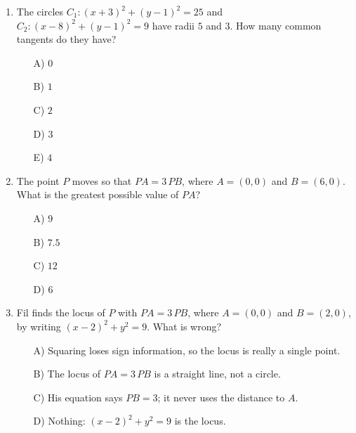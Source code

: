 \documentclass[11pt,a4paper]{article}
\begin{document}
\begin{enumerate}
\item The circles $C_1:(x+3)^2+(y-1)^2=25$ and $C_2:(x-8)^2+(y-1)^2=9$ have radii $5$ and $3$. How many common tangents do they have?
\begin{itemize}
\item[A)] $0$
\item[B)] $1$
\item[C)] $2$
\item[D)] $3$
\item[E)] $4$
\end{itemize}


\item The point $P$ moves so that $PA=3\,PB$, where $A=(0,0)$ and $B=(6,0)$. What is the greatest possible value of $PA$?
\begin{itemize}
\item[A)] $9$
\item[B)] $7.5$
\item[C)] $12$
\item[D)] $6$
\end{itemize}


\item Fil finds the locus of $P$ with $PA=3\,PB$, where $A=(0,0)$ and $B=(2,0)$, by writing $(x-2)^2+y^2=9$. What is wrong?
\begin{itemize}
\item[A)] Squaring loses sign information, so the locus is really a single point.
\item[B)] The locus of $PA=3\,PB$ is a straight line, not a circle.
\item[C)] His equation says $PB=3$; it never uses the distance to $A$.
\item[D)] Nothing: $(x-2)^2+y^2=9$ is the locus.
\end{itemize}


\end{enumerate}
\end{document}
